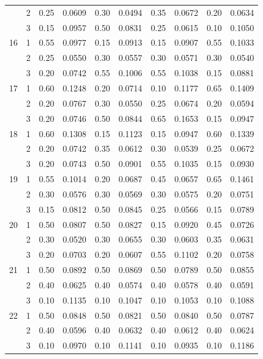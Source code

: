 \begin{longtable}{llcccccccc}
   & 2 & 0.25 & 0.0609 & 0.30 & 0.0494 & 0.35 & 0.0672 & 0.20 & 0.0634 \\ 
   & 3 & 0.15 & 0.0957 & 0.50 & 0.0831 & 0.25 & 0.0615 & 0.10 & 0.1050 \\ 
  16 & 1 & 0.55 & 0.0977 & 0.15 & 0.0913 & 0.15 & 0.0907 & 0.55 & 0.1033 \\ 
   & 2 & 0.25 & 0.0550 & 0.30 & 0.0557 & 0.30 & 0.0571 & 0.30 & 0.0540 \\ 
   & 3 & 0.20 & 0.0742 & 0.55 & 0.1006 & 0.55 & 0.1038 & 0.15 & 0.0881 \\ 
  17 & 1 & 0.60 & 0.1248 & 0.20 & 0.0714 & 0.10 & 0.1177 & 0.65 & 0.1409 \\ 
   & 2 & 0.20 & 0.0767 & 0.30 & 0.0550 & 0.25 & 0.0674 & 0.20 & 0.0594 \\ 
   & 3 & 0.20 & 0.0746 & 0.50 & 0.0844 & 0.65 & 0.1653 & 0.15 & 0.0947 \\ 
  18 & 1 & 0.60 & 0.1308 & 0.15 & 0.1123 & 0.15 & 0.0947 & 0.60 & 0.1339 \\ 
   & 2 & 0.20 & 0.0742 & 0.35 & 0.0612 & 0.30 & 0.0539 & 0.25 & 0.0672 \\ 
   & 3 & 0.20 & 0.0743 & 0.50 & 0.0901 & 0.55 & 0.1035 & 0.15 & 0.0930 \\ 
  19 & 1 & 0.55 & 0.1014 & 0.20 & 0.0687 & 0.45 & 0.0657 & 0.65 & 0.1461 \\ 
   & 2 & 0.30 & 0.0576 & 0.30 & 0.0569 & 0.30 & 0.0575 & 0.20 & 0.0751 \\ 
   & 3 & 0.15 & 0.0812 & 0.50 & 0.0845 & 0.25 & 0.0566 & 0.15 & 0.0789 \\ 
  20 & 1 & 0.50 & 0.0807 & 0.50 & 0.0827 & 0.15 & 0.0920 & 0.45 & 0.0726 \\ 
   & 2 & 0.30 & 0.0520 & 0.30 & 0.0655 & 0.30 & 0.0603 & 0.35 & 0.0631 \\ 
   & 3 & 0.20 & 0.0703 & 0.20 & 0.0607 & 0.55 & 0.1102 & 0.20 & 0.0758 \\ 
  21 & 1 & 0.50 & 0.0892 & 0.50 & 0.0869 & 0.50 & 0.0789 & 0.50 & 0.0855 \\ 
   & 2 & 0.40 & 0.0625 & 0.40 & 0.0574 & 0.40 & 0.0578 & 0.40 & 0.0591 \\ 
   & 3 & 0.10 & 0.1135 & 0.10 & 0.1047 & 0.10 & 0.1053 & 0.10 & 0.1088 \\ 
  22 & 1 & 0.50 & 0.0848 & 0.50 & 0.0821 & 0.50 & 0.0840 & 0.50 & 0.0787 \\ 
   & 2 & 0.40 & 0.0596 & 0.40 & 0.0632 & 0.40 & 0.0612 & 0.40 & 0.0624 \\ 
   & 3 & 0.10 & 0.0970 & 0.10 & 0.1141 & 0.10 & 0.0935 & 0.10 & 0.1186 \\ 

\end{longtable}
